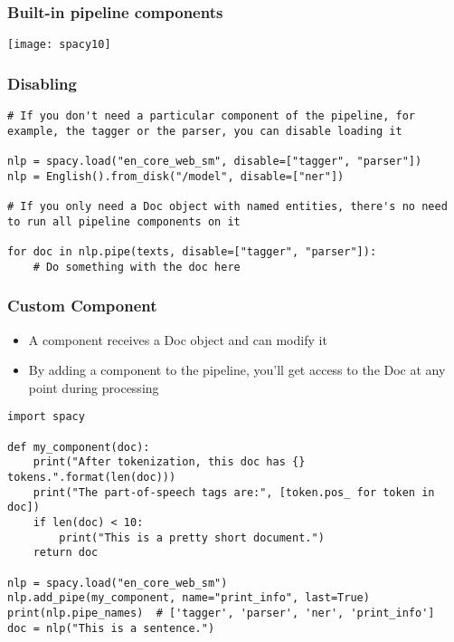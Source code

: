 \begin{frame}[fragile]\frametitle{Built-in pipeline components}
\begin{center}
\texttt{[image: spacy10]}
\end{center}

\end{frame}

\begin{frame}[fragile]\frametitle{Disabling}
\begin{lstlisting}
# If you don't need a particular component of the pipeline, for example, the tagger or the parser, you can disable loading it
		
nlp = spacy.load("en_core_web_sm", disable=["tagger", "parser"])
nlp = English().from_disk("/model", disable=["ner"])

# If you only need a Doc object with named entities, there's no need to run all pipeline components on it

for doc in nlp.pipe(texts, disable=["tagger", "parser"]):
    # Do something with the doc here
\end{lstlisting}
	
	
\end{frame}

\begin{frame}[fragile]\frametitle{Custom Component}
  \begin{itemize}
    \item A component receives a Doc object and can modify it


\item  By adding a component to the pipeline, you'll get access to the Doc at any point during processing
  \end{itemize}
	
		\begin{lstlisting}
import spacy

def my_component(doc):
    print("After tokenization, this doc has {} tokens.".format(len(doc)))
    print("The part-of-speech tags are:", [token.pos_ for token in doc])
    if len(doc) < 10:
        print("This is a pretty short document.")
    return doc

nlp = spacy.load("en_core_web_sm")
nlp.add_pipe(my_component, name="print_info", last=True)
print(nlp.pipe_names)  # ['tagger', 'parser', 'ner', 'print_info']
doc = nlp("This is a sentence.")
\end{lstlisting}	
	
\end{frame}

